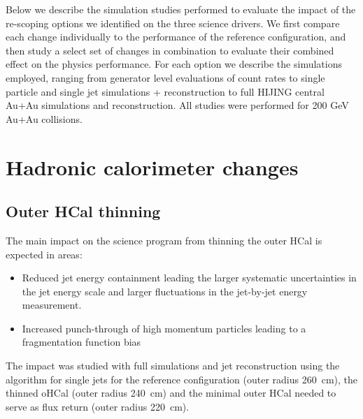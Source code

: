 
Below we describe the simulation studies performed to evaluate the impact of the re-scoping options we identified on the three 
science drivers. We  first compare each change individually to the performance of the reference configuration, and then study
a select set of changes in combination to evaluate their combined effect on the physics performance. For each option we 
describe the simulations employed, ranging from generator level evaluations of count rates to single particle and single jet
\geant simulations + reconstruction to full HIJING central Au+Au \geant simulations and reconstruction. All studies were 
performed for 200 GeV Au+Au collisions.
\section{Hadronic calorimeter changes}
\subsection{Outer HCal thinning}
The main impact on the science program from thinning the outer HCal is expected in areas:
\begin{itemize} 
\item Reduced jet energy containment leading the larger systematic uncertainties in the jet energy scale and larger fluctuations
in the jet-by-jet energy measurement.
\item Increased punch-through of high momentum particles leading to a fragmentation function bias
\end{itemize}
The impact was studied with full \geant simulations and jet reconstruction using the \antikt algorithm for single jets 
for the reference configuration (outer radius 260~cm), the thinned oHCal (outer radius 240~cm) and the minimal outer HCal needed 
to serve as flux return (outer radius 220~cm). 

